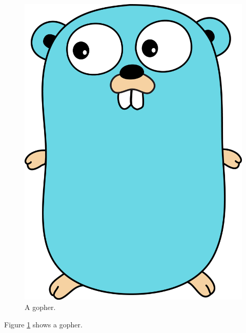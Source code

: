 \documentclass{article}
\begin{document}
\begin{figure}
  \centering
  \includegraphics[width=.35\linewidth]{gopher}
  \caption{A gopher.}
  \label{fig:gopher1}
\end{figure}
Figure \ref{fig:gopher1} shows a gopher.
\end{document}
